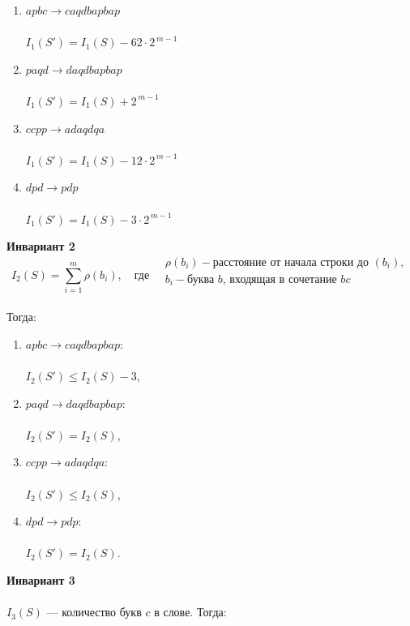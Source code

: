 \documentclass[a4paper,12pt]{article}
\begin{document}
\begin{enumerate}[label=\Roman*.] 
    \item $apbc \rightarrow caqdbapbap$ \\\\ 
        $I_1(S') = I_1(S) - 62 \cdot 2^{\,m-1}$ 
    \item $paqd \rightarrow daqdbapbap$ \\\\ 
        $I_1(S') = I_1(S) + 2^{\,m-1}$ 
    \item $ccpp \rightarrow adaqdqa$ \\\\ 
        $I_1(S') = I_1(S) - 12 \cdot 2^{\,m-1}$ 
    \item $dpd \rightarrow pdp$ \\\\
        $I_1(S') = I_1(S) - 3 \cdot 2^{\,m-1}$ \\ 
\end{enumerate}

\textbf{Инвариант 2} 
\[
I_2(S) = \sum_{i=1}^{m} \rho(b_i),
\quad \text{где} \quad
\begin{array}{l}
\rho(b_i) - \text{расстояние от начала строки до } (b_i), \\
b_i - \text{буква } b \text{, входящая в сочетание } bc \\\\
\end{array}
\]

Тогда: 

\begin{enumerate}[label=\Roman*.]
    \item $apbc \rightarrow caqdbapbap$: \\\\ 
        $I_2(S') \le I_2(S) - 3$,
    \item $paqd \rightarrow daqdbapbap$: \\\\  
        $I_2(S') = I_2(S)$,
    \item $ccpp \rightarrow adaqdqa$: \\\\ 
        $I_2(S') \le I_2(S)$,
    \item $dpd \rightarrow pdp$: \\\\ 
        $I_2(S') = I_2(S)$. \\
\end{enumerate}


\textbf{Инвариант 3} \\\\
$I_3(S)$ — количество букв $c$ в слове. Тогда:
\end{document}
